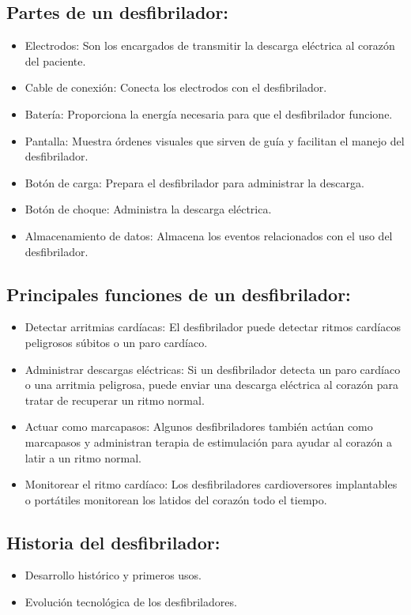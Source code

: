 \subsection{Partes de un desfibrilador:}
\begin{itemize}
    \item Electrodos: Son los encargados de transmitir la descarga eléctrica al corazón del paciente.
    \item Cable de conexión: Conecta los electrodos con el desfibrilador.
    \item Batería: Proporciona la energía necesaria para que el desfibrilador funcione.
    \item Pantalla: Muestra órdenes visuales que sirven de guía y facilitan el manejo del desfibrilador.
    \item Botón de carga: Prepara el desfibrilador para administrar la descarga.
    \item Botón de choque: Administra la descarga eléctrica.
    \item Almacenamiento de datos: Almacena los eventos relacionados con el uso del desfibrilador.
\end{itemize}

\subsection{Principales funciones de un desfibrilador:}
\begin{itemize}
    \item Detectar arritmias cardíacas: El desfibrilador puede detectar ritmos cardíacos peligrosos súbitos o un paro cardíaco.
    \item Administrar descargas eléctricas: Si un desfibrilador detecta un paro cardíaco o una arritmia peligrosa, puede enviar una descarga eléctrica al corazón para tratar de recuperar un ritmo normal.
    \item Actuar como marcapasos: Algunos desfibriladores también actúan como marcapasos y administran terapia de estimulación para ayudar al corazón a latir a un ritmo normal.
    \item Monitorear el ritmo cardíaco: Los desfibriladores cardioversores implantables o portátiles monitorean los latidos del corazón todo el tiempo.
\end{itemize}

\subsection{Historia del desfibrilador:}
\begin{itemize}
    \item Desarrollo histórico y primeros usos.
    \item Evolución tecnológica de los desfibriladores.
\end{itemize}

